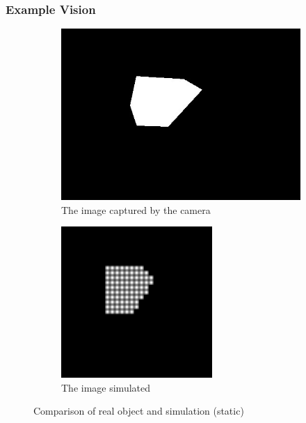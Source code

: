 \documentclass[]{beamer}
\theoremstyle{remark}
\begin{document}
\begin{frame}
	\frametitle{Example Vision}
	\begin{figure}[h] %
		\centering
		
		\begin{subfigure}{0.45\textwidth}
			\centering
			\includegraphics[width=\textwidth]{first_orig_frame.png}
			\caption{The image captured by the camera}
			\label{compare_images:orig}
		\end{subfigure}
		\hfill
		\begin{subfigure}{0.45\textwidth}
			\centering
			\includegraphics[width=\textwidth]{first_simulated_frame.png}
			\caption{The image simulated}
			\label{compare_images:analysed}
		\end{subfigure}
		
		\caption{Comparison of real object and simulation (static)}
		\label{fig:image_comparison}
	\end{figure}
\end{frame}
\end{document}
